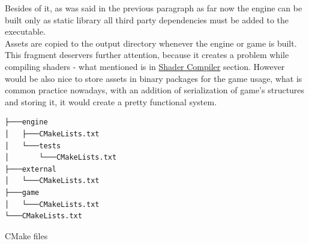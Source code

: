 Besides of it, as was said in the previous paragraph as far now the engine can be built only as static library all third party dependencies must be added to the executable.\\
Assets are copied to the output directory whenever the engine or game is built. This fragment deservers further attention, because it creates a problem while compiling shaders - what mentioned is in \hyperref[problem_with_shader_compilation]{Shader Compiler} section. However would be also nice to store assets in binary packages for the game usage, what is common practice nowadays, with an addition of serialization of game's structures and storing it, it would create a pretty functional system.
\newpage
\begin{verbatim}
├───engine
│   ├───CMakeLists.txt
│   └───tests
│       └───CMakeLists.txt
├───external
│   └───CMakeLists.txt
├───game
│   └───CMakeLists.txt
└───CMakeLists.txt
\end{verbatim}
\begin{table}[h]
\caption{CMake files}
\end{table}
\newpage
